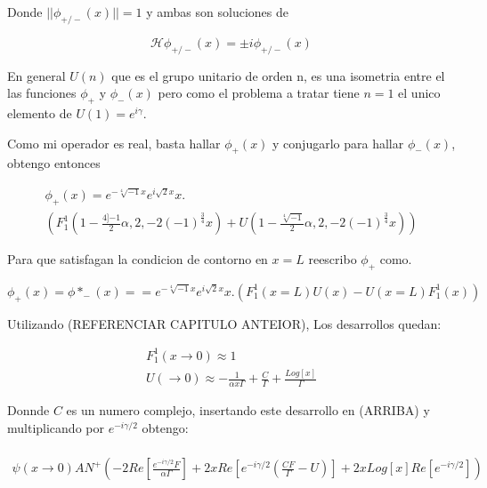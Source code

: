 Donde $|| \phi _{+/-} (x) || = 1$ y ambas son soluciones de 

\begin{equation}
\mathscr{H} \phi _{+/-} (x) = \pm i \phi _{+/-} (x)
\end{equation}

En general $U(n)$ que es el grupo unitario de orden n, es una isometria entre el las funciones $\phi _{+}$ y $\phi _{-} (x) $ pero como el problema a tratar tiene $n=1$ el unico elemento de $U(1) = e ^{i \gamma}$.


Como mi operador es real, basta hallar $\phi _{+} (x) $ y conjugarlo para hallar $ \phi _{-} (x) $, obtengo entonces 

\begin{equation}
\begin{array}{c}
\phi _{+} (x) = e ^{- \sqrt[4]{-1} x } e ^{i \sqrt{2} x } x . \\
\left(
F _1 ^1 (1 - \frac{ 4]{-1} }{2} \alpha ,2 , -2 (-1) ^{\frac{3}{4} } x )  +
U(1 - \frac{ \sqrt[4]{-1} }{2} \alpha ,2 , -2 (-1) ^{\frac{3}{4} } x )
\right)
\end{array}
\end{equation}

Para que satisfagan la condicion de contorno en $ x=L $ reescribo $ \phi _{+}$ como.

\begin{equation}
\phi _{+} (x) = \phi * _{-} (x) = 
= e ^{- \sqrt[4]{-1} x } e ^{i \sqrt{2} x } x.
\left(
F _1 ^1 (x=L) U(x) - U(x=L) F _1 ^1 (x)
\right)
\end{equation}


Utilizando (REFERENCIAR CAPITULO ANTEIOR), Los desarrollos quedan:

\begin{equation}
\begin{array}{c}
F _1 ^1 (x \rightarrow 0 ) \approx 1 \\
U( \rightarrow 0  ) \approx - \frac{1}{\alpha x \Gamma} + \frac{C}{\Gamma} + \frac{Log[x]}{\Gamma}
\end{array}
\end{equation}


Donnde $C$ es un numero complejo, insertando este desarrollo en (ARRIBA) y multiplicando por $ e ^{- i \gamma /2}$ obtengo:

\begin{equation}
\begin{array}{c} \\
\psi (x \rightarrow 0 )
A N ^{+}
\left(
-2 Re[ \frac{e ^{-i \gamma /2} F}{\alpha \Gamma} ] + 
2 x Re [ e ^{-i \gamma /2} (\frac{C F}{\Gamma} - U ) ] + 
2 x Log[x] Re [ e ^{- i \gamma /2 }]
\right)
\end{array}
\end{equation}

